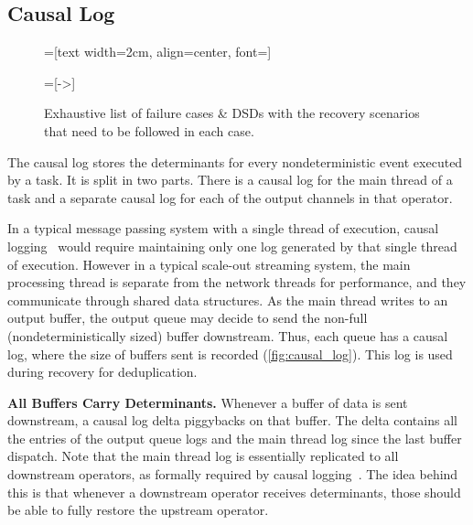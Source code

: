 \documentclass[sigconf]{acmart}
\newcommand{\para}[1]{\vspace{1mm}\noindent\textbf{#1.}}
\begin{document}
\subsection{Causal Log}
\label{sub:causal}

\begin{figure}

=[text width=2cm, 
                       align=center, 
                       font=\sffamily]

=[->]


\newcommand{\redtext}[1]{\color{red}\relscale{.7}\textit{#1}}

\vspace{-4mm}
\caption{Exhaustive list of failure cases \& DSDs with the recovery scenarios that need to be followed in each case.}
\label{fig:recovery-cases}
 \vspace{-2mm}
\end{figure}

The causal log stores the determinants for every nondeterministic event executed by a task. It is split in two parts. There is a causal log for the main thread of a task and a separate causal log for each of the output channels in that operator. 

In a typical message passing system with a single thread of execution, causal logging~\cite{elnozahy1994manetho} would require maintaining only one log generated by that single thread of execution.
However in a typical scale-out streaming system, the main processing thread is separate from the network threads for performance, and they communicate through shared data structures.
As the main thread writes to an output buffer, the output queue may decide to send the non-full (nondeterministically sized) buffer downstream.
Thus, each queue has a causal log, where the size of buffers sent is recorded (\autoref{fig:causal_log}). This log is used during recovery for deduplication.

\para{All Buffers Carry Determinants} Whenever a buffer of data is sent downstream, a causal log delta piggybacks on that buffer. The delta contains all the  entries of the output queue logs and the main thread log since the last buffer dispatch. Note that the main thread log is essentially replicated to all downstream operators, as formally required by causal logging~\cite{elnozahy1994manetho}. The idea behind this is that whenever a downstream operator receives determinants, those should be able to fully restore the upstream operator. 
\end{document}
